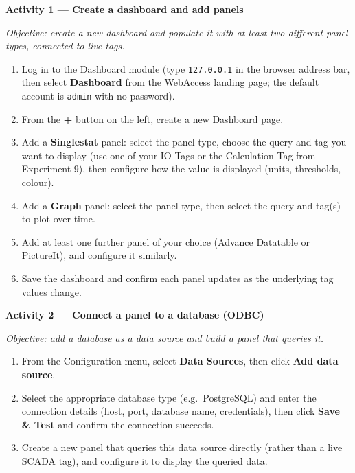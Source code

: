 \begin{procedure}

  \textbf{Activity 1 --- Create a dashboard and add panels}\vspace{2pt}

  \textit{Objective: create a new dashboard and populate it with at least two different panel types, connected to live tags.}

  \begin{enumerate}
    \item Log in to the Dashboard module (type \texttt{127.0.0.1} in the browser address bar, then select \textbf{Dashboard} from the WebAccess landing page; the default account is \texttt{admin} with no password).
    \item From the \textbf{+} button on the left, create a new Dashboard page.
    \item Add a \textbf{Singlestat} panel: select the panel type, choose the query and tag you want to display (use one of your IO Tags or the Calculation Tag from Experiment 9), then configure how the value is displayed (units, thresholds, colour).
    \item Add a \textbf{Graph} panel: select the panel type, then select the query and tag(s) to plot over time.
    \item Add at least one further panel of your choice (Advance Datatable or PictureIt), and configure it similarly.
    \item Save the dashboard and confirm each panel updates as the underlying tag values change.
  \end{enumerate}
  \vspace*{1.5em}

  \textbf{Activity 2 --- Connect a panel to a database (ODBC)}\vspace{2pt}

  \textit{Objective: add a database as a data source and build a panel that queries it.}

  \begin{enumerate}
    \item From the Configuration menu, select \textbf{Data Sources}, then click \textbf{Add data source}.
    \item Select the appropriate database type (e.g.\ PostgreSQL) and enter the connection details (host, port, database name, credentials), then click \textbf{Save \& Test} and confirm the connection succeeds.
    \item Create a new panel that queries this data source directly (rather than a live SCADA tag), and configure it to display the queried data.
  \end{enumerate}
  \vspace*{1.5em}


\end{procedure}
